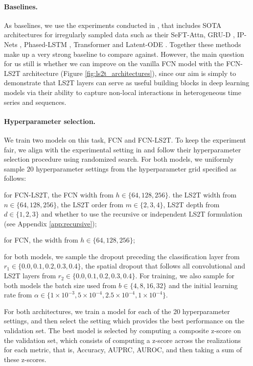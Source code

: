 \documentclass{article} \usepackage{iclr2021_conference,times}
\theoremstyle{plain}
\theoremstyle{definition}
\begin{document}
\paragraph{Baselines.} As baselines, we use the experiments conducted in \citet{horn2020set}, that includes SOTA architectures for irregularly sampled data such as their {\sc SeFT-Attn}, {\sc GRU-D} \citep{che2018recurrent}, {\sc IP-Nets} \citep{shukla2019interpolation}, {\sc Phased-LSTM} \citep{neil2016phased}, {\sc Transformer} \citep{vaswani2017attention} and {\sc Latent-ODE} \citep{rubanova2016latent}. Together these methods make up a very strong baseline to compare against. However, the main question for us still is whether we can improve on the vanilla FCN model with the FCN-LS2T architecture (Figure \ref{fig:ls2t_architectures}), since our aim is simply to demonstrate that LS2T layers can serve as useful building blocks in deep learning models via their ability to capture non-local interactions in heterogeneous time series and sequences.

\paragraph{Hyperparameter selection.} We train two models on this task, FCN and FCN-LS2T. To keep the experiment fair, we align with the experimental setting in \citet{horn2020set} and follow their hyperparameter selection procedure using randomized search. For both models, we uniformly sample $20$ hyperparameter settings from the hyperparameter grid specified as follows: \begin{enumerate*}[label=(\arabic*)] \item for FCN-LS2T, the FCN width from $h \in \{64, 128, 256\}$. the LS2T width from $n \in \{64, 128, 256\}$, the LS2T order from $m \in \{2, 3, 4\}$, LS2T depth from $d \in \{1, 2, 3\}$ and whether to use the recursive or independent LS2T formulation (see Appendix \ref{app:recursive}); \item for FCN, the width from $h \in \{64, 128, 256\}$; \item for both models, we sample the dropout preceding the classification layer from $r_1 \in \{0.0, 0.1, 0.2, 0.3, 0.4\}$, the spatial dropout that follows all convolutional and LS2T layers from $r_2 \in \{0.0, 0.1, 0.2, 0.3, 0.4\}$. For training, we also sample for both models the batch size used from $b \in \{4, 8, 16, 32\}$ and the initial learning rate from $\alpha \in \{1 \times 10^{-3}, 5 \times 10^{-4}, 2.5 \times 10^{-4}, 1 \times 10^{-4}\}$. \end{enumerate*} For both architectures, we train a model for each of the 20 hyperparameter settings, and then select the setting which provides the best performance on the validation set. The best model is selected by computing a composite z-score on the validation set, which consists of computing a z-score across the realizations for each metric, that is, {\sc Accuracy}, {\sc AUPRC}, {\sc AUROC}, and then taking a sum of these z-scores.
\end{document}
